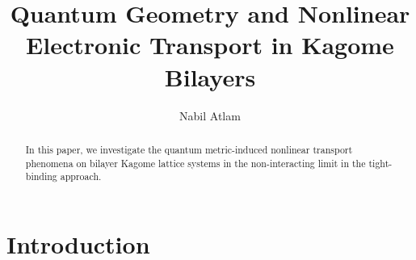 \documentclass[reprint,aps,superscriptaddress]{revtex4-2}
\begin{document}
\title{
Quantum Geometry and Nonlinear Electronic Transport in Kagome Bilayers
}
\author{Nabil Atlam}




\begin{abstract}

In this paper, we investigate the quantum metric-induced nonlinear transport phenomena on bilayer Kagome lattice systems in the non-interacting limit in the tight-binding approach. 

\cite{tangHighTemperatureFractionalQuantum2011a}

\end{abstract}

\maketitle

\section{Introduction}

\cite{hayamiNonlinearNonreciprocalTransport2022}
\cite{kaplanUnificationNonlinearAnomalous2024}


\end{document}

